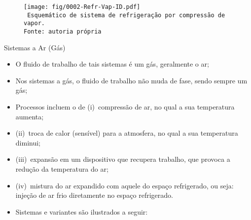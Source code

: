     \begin{frame}\vspace*{-0em}
        \begin{center}
            \begin{figure}
                \fontsize{3.0}{4}\selectfont
                \texttt{[image: fig/0002-Refr-Vap-ID.pdf]}
                \\\vspace*{-0.0em}\texttt{%
                    Esquemático de sistema de refrigeração por compressão de vapor.\\
                    Fonte: autoria própria
                }
            \end{figure}
        \end{center}
    \end{frame}

    \begin{frame}{Sistemas a Ar (Gás)}\vspace*{-0em}
        \begin{itemize}
            \item<1-> O \alert{fluido de trabalho} de tais sistemas é um \alert{gás}, geralmente
                o \alert{ar};
            \item<2-> Nos sistemas a gás, o fluido de trabalho \alert{não muda de fase}, sendo
                sempre um gás;
            \item<3-> Processos incluem o de (i)~\alert{compressão} de ar, no qual a sua
                temperatura \alert{aumenta};
            \item<4-> (ii)~\alert{troca de calor} (sensível) para a atmosfera, no qual a sua temperatura \alert{diminui};
            \item<5-> (iii)~\alert{expansão} em um dispositivo que recupera \alert{trabalho},
                que provoca a \alert{redução} da temperatura do ar;
            \item<6-> (iv)~\alert{mistura} do ar expandido com aquele do espaço refrigerado, ou
                seja: \alert{injeção de ar frio} diretamente no espaço refrigerado.
            \item<7-> Sistemas e variantes são ilustrados a seguir:
        \end{itemize}
    \end{frame}


